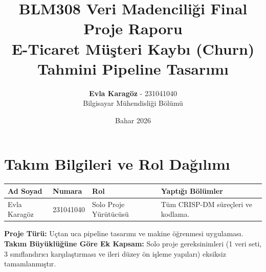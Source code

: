 \documentclass[11pt,a4paper]{article}
\title{\textbf{BLM308 Veri Madenciliği Final Proje Raporu\\E-Ticaret Müşteri Kaybı (Churn) Tahmini Pipeline Tasarımı}}
\author{\textbf{Evla Karagöz} - 231041040\\Bilgisayar Mühendisliği Bölümü}
\date{Bahar 2026}
\begin{document}
	\maketitle
	
	
	\setlength{\fboxrule}{1.5pt} %
	\setlength{\fboxsep}{12pt} %
	
	\noindent
			

	\newpage

	\section*{Takım Bilgileri ve Rol Dağılımı}
\begin{table}[h]
    \centering
    \renewcommand{\arraystretch}{1.35}
    \begin{tabular}{|p{4cm}|p{3cm}|p{3.5cm}|p{4.5cm}|}
        \hline
        \textbf{Ad Soyad} & \textbf{Numara} & \textbf{Rol} & \textbf{Yaptığı Bölümler} \\ \hline
        Evla Karagöz & 231041040 & Solo Proje Yürütücüsü & Tüm CRISP-DM süreçleri ve kodlama. \\ \hline
    \end{tabular}
\end{table}

\noindent \textbf{Proje Türü:} Uçtan uca pipeline tasarımı ve makine öğrenmesi uygulaması.\\
\textbf{Takım Büyüklüğüne Göre Ek Kapsam:} Solo proje gereksinimleri (1 veri seti, 3 sınıflandırıcı karşılaştırması ve ileri düzey ön işleme yapıları) eksiksiz tamamlanmıştır.
\end{document}
